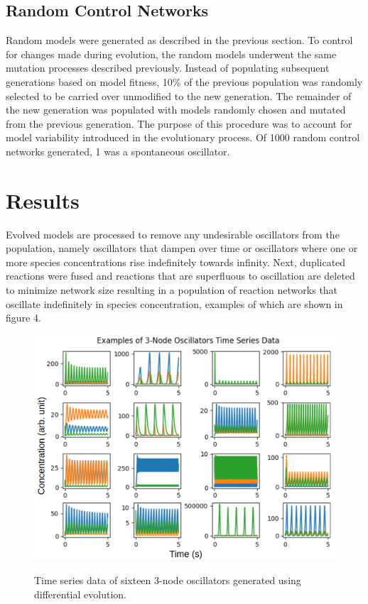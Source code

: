 \documentclass[12pt]{report}
\begin{document}
\subsection{Random Control Networks}
Random models were generated as described in the previous section. To control for changes made during evolution, the random models underwent the same mutation processes described previously. Instead of populating subsequent generations based on model fitness, 10\% of the previous population was randomly selected to be carried over unmodified to the new generation. The remainder of the new generation was populated with models randomly chosen and mutated from the previous generation. The purpose of this procedure was to account for model variability introduced in the evolutionary process. Of 1000 random control networks generated, 1 was a spontaneous oscillator.

\section{Results}
Evolved models are processed to remove any undesirable oscillators from the population, namely oscillators that dampen over time or oscillators where one or more species concentrations rise indefinitely towards infinity. Next,  duplicated reactions were fused and reactions that are superfluous to oscillation are deleted to minimize network size resulting in a population of reaction networks that oscillate indefinitely in species concentration, examples of which are shown in figure 4.

\begin{figure}
    \includegraphics[width=15cm]{images/examples.png}
    \label{fig:examples}
    \caption[Examples of oscillator time series data]{Time series data of sixteen 3-node oscillators generated using differential evolution.}
\end{figure}
\end{document}
